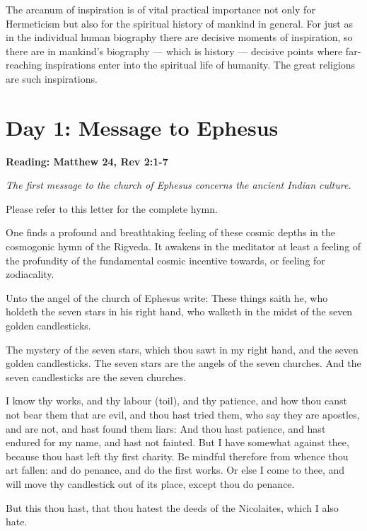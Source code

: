 \begin{quotationx}
The arcanum of inspiration is of vital practical importance not only for Hermeticism but also for the spiritual history of mankind in general. For just as in the individual human biography there are decisive moments of inspiration, so there are in mankind's biography — which is history — decisive points where far-reaching inspirations enter into the spiritual life of humanity. The great religions are such inspirations. 

\end{quotationx}

\section{Day 1: Message to Ephesus}

\textbf{Reading: Matthew 24, Rev 2:1-7}

\emph{The first message to the church of Ephesus concerns the ancient Indian culture.}

Please refer to this letter for the complete hymn.

\begin{quotex}

One finds a profound and breathtaking feeling of these cosmic depths in the cosmogonic hymn of the Rigveda. It awakens in the meditator at least a feeling of the profundity of the fundamental cosmic incentive towards, or feeling for zodiacality. 

\end{quotex}

\begin{quotationx}
Unto the angel of the church of Ephesus write: These things saith he, who holdeth the seven stars in his right hand, who walketh in the midst of the seven golden candlesticks. 

The mystery of the seven stars, which thou sawt in my right hand, and the seven golden candlesticks. The seven stars are the angels of the seven churches. And the seven candlesticks are the seven churches. 

I know thy works, and thy labour (toil), and thy patience, and how thou canst not bear them that are evil, and thou hast tried them, who say they are apostles, and are not, and hast found them liars: And thou hast patience, and hast endured for my name, and hast not fainted. But I have somewhat against thee, because thou hast left thy first charity. Be mindful therefore from whence thou art fallen: and do penance, and do the first works. Or else I come to thee, and will move thy candlestick out of its place, except thou do penance. 

But this thou hast, that thou hatest the deeds of the Nicolaites, which I also hate. 
\end{quotationx}

